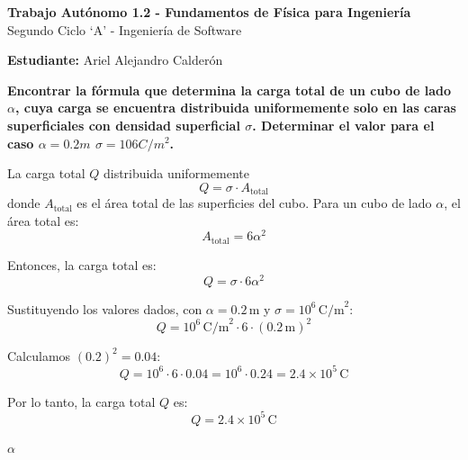 \documentclass[answers]{exam} %
\begin{document}
\begin{center}
	\large\textbf{Trabajo Autónomo 1.2 - Fundamentos de Física para Ingeniería}\\[1em]
	\large Segundo Ciclo \enquote*{A} - Ingeniería de Software\\[1em]
\end{center}

\vspace{0.5cm}
\large\textbf{Estudiante:} Ariel Alejandro Calderón
\vspace{0.5cm}

\begin{questions}

	\question \large\textbf{Encontrar la fórmula que determina la carga total de un cubo de lado $\alpha$, cuya carga se encuentra distribuida uniformemente solo en las caras superficiales con densidad superficial $\sigma$. Determinar el valor para el caso $\alpha = 0.2 m$ $\sigma = 106C/m^2$.}

	\vspace{0.5cm}



	\begin{multicols}{2} %
		La carga total \( Q \) distribuida uniformemente
		\[
			Q = \sigma \cdot A_{\text{total}}
		\]
		donde \( A_{\text{total}} \) es el área total de las superficies del cubo. Para un cubo de lado \( \alpha \), el área total es:
		\[
			A_{\text{total}} = 6 \alpha^2
		\]

		Entonces, la carga total es:
		\[
			Q = \sigma \cdot 6 \alpha^2
		\]

		Sustituyendo los valores dados, con \( \alpha = 0.2 \, \text{m} \) y \( \sigma = 10^6 \, \text{C/m}^2 \):
		\[
			Q = 10^6 \, \text{C/m}^2 \cdot 6 \cdot (0.2 \, \text{m})^2
		\]

		Calculamos \( (0.2)^2 = 0.04 \):
		\[
			Q = 10^6 \cdot 6 \cdot 0.04 = 10^6 \cdot 0.24 = 2.4 \times 10^5 \, \text{C}
		\]

		Por lo tanto, la carga total \( Q \) es:
		\[
			Q = 2.4 \times 10^5 \, \text{C}
		\]
	\end{multicols}

	\begin{minipage}{\textwidth}
		\centering
		$\alpha$
	\end{minipage}


\end{questions}
\end{document}
